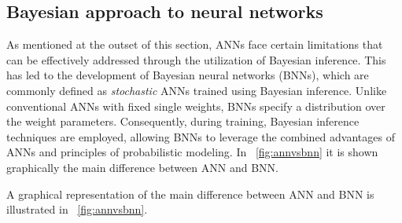\subsection{Bayesian approach to neural networks}

As mentioned at the outset of this section, ANNs face certain limitations that can be effectively addressed through the utilization of Bayesian inference. 
This has led to the development of Bayesian neural networks (BNNs), which are commonly defined as \textit{stochastic} ANNs trained using Bayesian inference. Unlike conventional ANNs with fixed single weights, BNNs specify a distribution over the weight parameters. 
Consequently, during training, Bayesian inference techniques are employed, allowing BNNs to leverage the combined advantages of ANNs and principles of probabilistic modeling. In \Fig~\ref{fig:annvsbnn} it is shown graphically the main difference between ANN and BNN.

A graphical representation of the main difference between ANN and BNN is illustrated in \Fig~\ref{fig:annvsbnn}.

